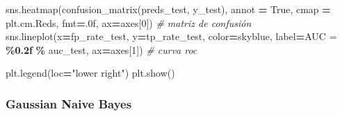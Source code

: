 \documentclass[
  a4paper,
  DIV=11,
  numbers=noendperiod]{scrreprt}
\newenvironment{Shaded}{\begin{snugshade}}{\end{snugshade}}
\newcommand{\CommentTok}[1]{\textcolor[rgb]{0.56,0.35,0.01}{\textit{#1}}}
\newcommand{\DecValTok}[1]{\textcolor[rgb]{0.00,0.00,0.81}{#1}}
\newcommand{\NormalTok}[1]{#1}
\newcommand{\OperatorTok}[1]{\textcolor[rgb]{0.81,0.36,0.00}{\textbf{#1}}}
\newcommand{\SpecialCharTok}[1]{\textcolor[rgb]{0.81,0.36,0.00}{\textbf{#1}}}
\newcommand{\StringTok}[1]{\textcolor[rgb]{0.31,0.60,0.02}{#1}}
\newcommand{\VariableTok}[1]{\textcolor[rgb]{0.00,0.00,0.00}{#1}}
\begin{document}
\begin{Shaded}
\begin{Highlighting}[numbers=left,,]
\NormalTok{sns.heatmap(confusion\_matrix(preds\_test, y\_test), annot }\OperatorTok{=} \VariableTok{True}\NormalTok{, cmap }\OperatorTok{=}\NormalTok{ plt.cm.Reds, fmt}\OperatorTok{=}\StringTok{\textquotesingle{}.0f\textquotesingle{}}\NormalTok{, ax}\OperatorTok{=}\NormalTok{axes[}\DecValTok{0}\NormalTok{]) }\CommentTok{\# matriz de confusión}
\NormalTok{sns.lineplot(x}\OperatorTok{=}\NormalTok{fp\_rate\_test, y}\OperatorTok{=}\NormalTok{tp\_rate\_test, color}\OperatorTok{=}\StringTok{\textquotesingle{}skyblue\textquotesingle{}}\NormalTok{, label}\OperatorTok{=}\StringTok{\textquotesingle{}AUC = }\SpecialCharTok{\%0.2f}\StringTok{\textquotesingle{}} \OperatorTok{\%}\NormalTok{ auc\_test, ax}\OperatorTok{=}\NormalTok{axes[}\DecValTok{1}\NormalTok{]) }\CommentTok{\# curva roc}

\NormalTok{plt.legend(loc}\OperatorTok{=}\StringTok{"lower right"}\NormalTok{)}
\NormalTok{plt.show()}
\end{Highlighting}
\end{Shaded}

\subsubsection{Gaussian Naive Bayes}\label{gaussian-naive-bayes}
\end{document}
